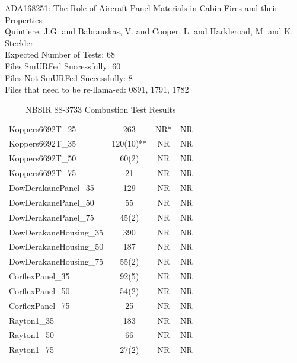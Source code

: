 \documentclass{abstract}
\begin{document}
 
 ADA168251: The Role of Aircraft Panel Materials in Cabin Fires and their Properties \\
 Quintiere, J.G. and Babrauskas, V. and Cooper, L. and Harkleroad, M. and K. Steckler \\
 Expected Number of Tests: 68 \\
 Files SmURFed Successfully: 60 \\
 Files Not SmURFed Successfully: 8 \\
 Files that need to be re-llama-ed: 0891, 1791, 1782
 
 
 
\begin{table}[htbp]
    \centering
    \caption{NBSIR 88-3733 Combustion Test Results}
    \label{tab:combustion_results}
    \begin{tabularx}{\textwidth}{|L|c|c|c|}
        \hline
         &  &  &  \\
        \hline
        Koppers6692T\_25 & 263 & NR* & NR  \\
        \hline
        Koppers6692T\_35 & 120(10)** & NR & NR \\
        \hline
        Koppers6692T\_50 & 60(2) & NR & NR \\
        \hline
        Koppers6692T\_75 & 21 & NR & NR \\
        \hline
        DowDerakanePanel\_35 & 129 & NR & NR \\
        \hline
        DowDerakanePanel\_50 & 55 & NR & NR \\
        \hline
        DowDerakanePanel\_75 & 45(2) & NR & NR \\
        \hline
        DowDerakaneHousing\_35 & 390 & NR & NR \\
        \hline
        DowDerakaneHousing\_50 & 187 & NR & NR \\
        \hline
        DowDerakaneHousing\_75 & 55(2) & NR & NR \\
        \hline
        CorflexPanel\_35 & 92(5) & NR & NR \\
        \hline
        CorflexPanel\_50 & 54(2) & NR & NR \\
        \hline
        CorflexPanel\_75 & 25 & NR & NR \\
        \hline
        Rayton1\_35 & 183 & NR & NR \\
        \hline
        Rayton1\_50 & 66 & NR & NR \\
        \hline
        Rayton1\_75 & 27(2) & NR & NR \\

\end{tabularx}
\end{table}
\end{document}

